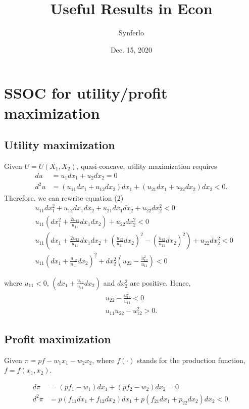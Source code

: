 \documentclass[12pt]{article}
\title{Useful Results in Econ}
\author{Synferlo}
\date{Dec. 15, 2020}
\begin{document}
\maketitle
\newpage


\section{SSOC for utility/profit maximization}

\subsection{Utility maximization}

Given $ U = U(X_1, X_2) $, quasi-concave, utility maximization requires
\begin{align}
				du  &= u_1dx_1 + u_2dx_2 = 0\\
				d^{2}u  &= (u_{11}dx_1 + u_{12}dx_2)dx_1 + (u_{21}dx_1 + u_{22}dx_2)dx_2
				< 0.
\end{align}
Therefore, we can rewrite equation (2)
\begin{align}
				&u_{11}dx_1^{2} + u_{12}dx_1dx_2 + u_{21}dx_1dx_2 + u_{22}dx_2^{2}  <0\\
				&u_{11}(dx_1^{2} + \frac{2u_{12}}{u_{11}}dx_1dx_2) + u_{22}dx_2^{2} <0\\
				&u_{11}\left(dx_1 + \frac{2u_{12}}{u_{11}}dx_1dx_2 + (\frac{u_{12}}{u_{11}}dx_2
				)^{2} - (\frac{u_{12}}{u_{11}}dx_2)^{2}\right) + u_{22}dx_2^{2} <0\\
				&u_{11}(dx_1 + \frac{u_{12}}{u_{11}}dx_2)^{2} + dx_2^{2}
				(u_{22} - \frac{u_{12}^{2}}{u_{11}}) < 0
\end{align}

where $ u_{11} < 0 $, $ (dx_1 + \frac{u_{12}}{u_{11}}dx_2) $ and $ dx_2^{2} $
are positive. Hence,
\begin{align}
				u_{22} - \frac{u_{12}^{2}}{u_{11}} < 0\\
				u_{11}u_{22} - u_{12}^{2} > 0.
\end{align}



\subsection{Profit maximization}

Given $ \pi = pf - w_1x_1 - w_2x_2 $, where $ f(\cdot ) $ stands for the 
production function, $ f = f(x_1, x_2) $.

\begin{align}
				d \pi  &= (pf_1 - w_1)dx_1 + (pf_2 - w_2)dx_2 =0\\
				d^{2} \pi  &= p(f_{11}dx_1 + f_{12}dx_2)dx_1 + p(f_{21}dx_1 + p_{22}dx_2)
				dx_2 <0.
\end{align}
\end{document}
